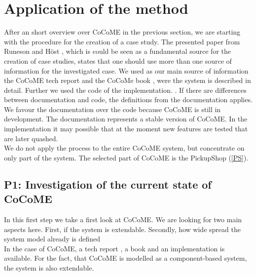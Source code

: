 \section{Application of the method}
\label{apllMethod}
After an short overview over CoCoME in the previous section, we are starting with the procedure for the creation of a case study. The presented paper from Runeson and H\"ost \cite{CaseStudySoftware}, which is could be seen as a fundamental source for the creation of case studies, states that one should use more than one source of information for the investigated case. We used as our main source of information the CoCoME tech report \cite{CoCoMETechReport} and the CoCoMe book \cite{CoCoMEBook}, were the system is described in detail. Further we used the code of the implementation.
. If there are differences between documentation and code, the definitions from the documentation applies. We favour the documentation over the code because CoCoME is still in development. The documentation represents a stable version of CoCoME. In the implementation it may possible that at the moment new features are tested that are later quashed.\\  We do not apply the process to the entire CoCoME system, but concentrate on only part of the system. The selected part of CoCoME is the PickupShop (\autoref{PS}).
\subsection{P1: Investigation of the current state of CoCoME}
In this first step we take a first look at CoCoME. We are looking for two main aspects here. First, if the system is extendable. Secondly, how wide spread the system model already is defined\\
In the case of CoCoME, a tech report \cite{CoCoMETechReport}, a book \cite{CoCoMEBook} and an implementation is available. For the fact, that CoCoME is modelled as a component-based system, the system is also  extendable.
